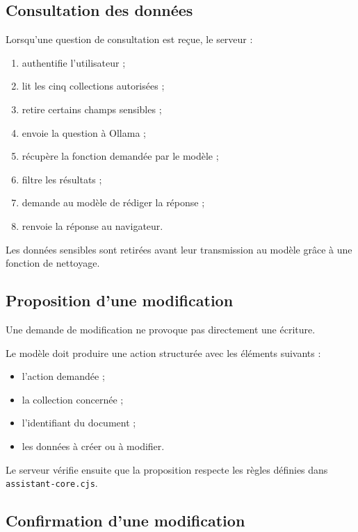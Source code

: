 \documentclass{rapportENSIAS}
\begin{document}
\subsection{Consultation des données}

Lorsqu’une question de consultation est reçue, le serveur :

\begin{enumerate}
    \item authentifie l’utilisateur ;
    \item lit les cinq collections autorisées ;
    \item retire certains champs sensibles ;
    \item envoie la question à Ollama ;
    \item récupère la fonction demandée par le modèle ;
    \item filtre les résultats ;
    \item demande au modèle de rédiger la réponse ;
    \item renvoie la réponse au navigateur.
\end{enumerate}

Les données sensibles sont retirées avant leur transmission au modèle grâce à une fonction de nettoyage.

\subsection{Proposition d’une modification}

Une demande de modification ne provoque pas directement une écriture.

Le modèle doit produire une action structurée avec les éléments suivants :

\begin{itemize}
    \item l’action demandée ;
    \item la collection concernée ;
    \item l’identifiant du document ;
    \item les données à créer ou à modifier.
\end{itemize}

Le serveur vérifie ensuite que la proposition respecte les règles définies dans \texttt{assistant-core.cjs}.

\subsection{Confirmation d’une modification}
\end{document}
